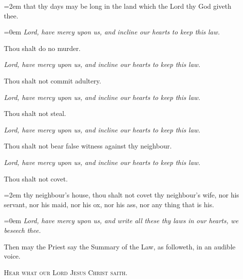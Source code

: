     \par\noindent
    \leftskip=2em
	{\small{that thy days may be long in the land which the Lord thy God giveth thee.}}
	\par
	\leftskip=0em
    \textit{Lord, have mercy upon us, and incline our hearts to keep this law.}
    \par\noindent
    Thou shalt do no murder.\par
    \textit{Lord, have mercy upon us, and incline our hearts to keep this law.}
    \par\noindent
    Thou shalt not commit adultery.\par
    \textit{Lord, have mercy upon us, and incline our hearts to keep this law.}
\par\noindent
    Thou shalt not steal.\par
    \textit{Lord, have mercy upon us, and incline our hearts to keep this law.}
\par\noindent
    Thou shalt not bear false witness against thy neighbour.\par
    \textit{Lord, have mercy upon us, and incline our hearts to keep this law.}
    \par\noindent
    Thou shalt not covet.
    \par\noindent
    \leftskip=2em
	{\small{thy neighbour's house, thou shalt not covet thy neighbour's wife, nor his servant, nor his maid, nor his ox, nor his ass, nor any thing that is his.}}
	\par
	\leftskip=0em
	\textit{Lord, have mercy upon us, and write all these thy laws in our hearts, we beseech thee.}
	
\begin{rubric}
	Then may the Priest say the Summary of the Law, as followeth, in an audible voice.
\end{rubric}
\begin{center}
	{\textsc{Hear what our Lord Jesus Christ saith.}}
\end{center}

